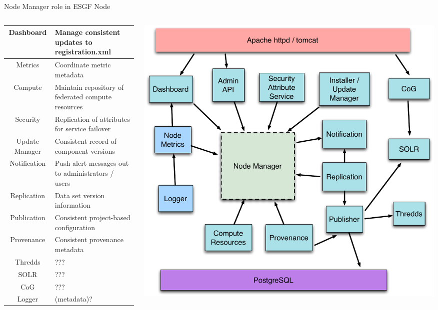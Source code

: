 \documentclass{beamer}
\begin{document}
\begin{frame}{Node Manager role in ESGF Node}

\begin{columns}
\begin{column}{.5\linewidth}

\tiny
\begin{tabularx}{6cm}{|c|X|}

\hline
Dashboard &  Manage consistent updates to registration.xml \\
\hline
Metrics & Coordinate metric metadata \\
\hline
Compute & Maintain repository of federated compute resources \\
\hline
Security & Replication of attributes for service failover \\
\hline
Update Manager & Consistent record of component versions \\
\hline
Notification & Push alert messages out to administrators / users \\
\hline
Replication & Data set version information \\
\hline
Publication & Consistent project-based configuration \\
\hline
Provenance & Consistent provenance metadata \\
\hline
Thredds & ??? \\
\hline
SOLR & ??? \\
\hline
CoG & ??? \\
\hline
Logger & (metadata)? \\
\hline
\end{tabularx}

\end{column}

\begin{column}{.5\linewidth}
\includegraphics[width=\textwidth]{ESGF-node-components.pdf}
\end{column}
\end{columns}

\end{frame}
\end{document}
